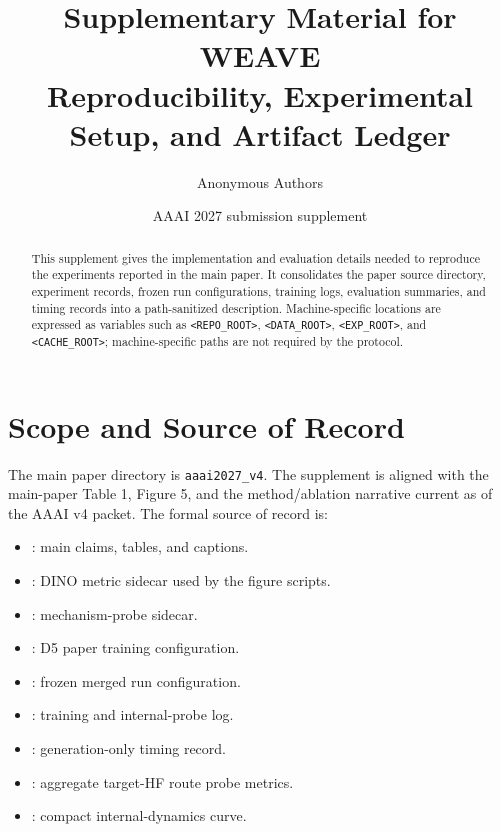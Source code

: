\documentclass[10pt,twocolumn]{article}
\title{\vspace{-1.0em}\textbf{Supplementary Material for WEAVE}\\
\large Reproducibility, Experimental Setup, and Artifact Ledger}
\author{Anonymous Authors}
\date{AAAI 2027 submission supplement}
\begin{document}
\maketitle

\begin{abstract}
This supplement gives the implementation and evaluation details needed to reproduce the
experiments reported in the main paper. It consolidates the paper source directory,
experiment records, frozen run configurations, training logs, evaluation summaries,
and timing records into a path-sanitized description. Machine-specific locations are
expressed as variables such as \texttt{<REPO\_ROOT>}, \texttt{<DATA\_ROOT>},
\texttt{<EXP\_ROOT>}, and \texttt{<CACHE\_ROOT>}; machine-specific paths are not
required by the protocol.
\end{abstract}

\section{Scope and Source of Record}

The main paper directory is \texttt{aaai2027\_v4}. The supplement is aligned with the
main-paper Table 1, Figure 5, and the method/ablation narrative current as of the AAAI v4
packet. The formal source of record is:
\begin{itemize}[leftmargin=1.5em,itemsep=0.2em]
  \item {}: main claims, tables, and captions.
  \item {}: DINO metric sidecar used by the figure scripts.
  \item {}: mechanism-probe sidecar.
  \item {}: D5 paper training configuration.
  \item {}: frozen merged run configuration.
  \item {}: training and internal-probe log.
  \item {}: generation-only timing record.
  \item {}: aggregate target-HF route probe metrics.
  \item {}: compact internal-dynamics curve.
\end{itemize}
\end{document}
